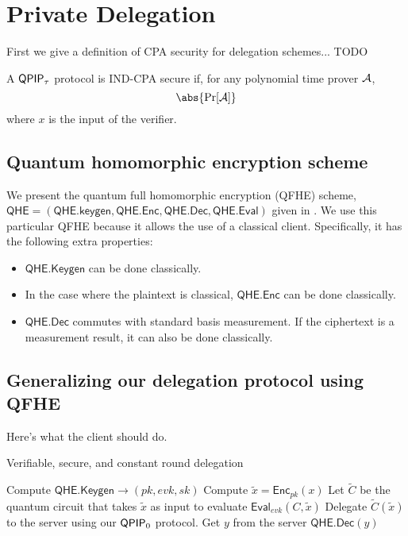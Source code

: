 \section{Private Delegation}


First we give a definition of CPA security for delegation schemes... TODO

\begin{dfn}
	A $\operatorname{\mathsf{QPIP}}_\tau$ protocol is IND-CPA secure if, for any polynomial time prover $\mathcal{A}$,
	$$\abs{\Pr[\cA]}$$
	where $x$ is the input of the verifier.
\end{dfn}

\subsection{Quantum homomorphic encryption scheme}


We present the quantum full homomorphic encryption (QFHE) scheme, $\mathsf{QHE}=(\mathsf{QHE.keygen}, \mathsf{QHE.Enc}, \mathsf{QHE.Dec}, \mathsf{QHE.Eval})$ given in \cite{mahadev_qfhe}. We use this particular QFHE because it allows the use of a classical client. Specifically, it has the following extra properties:
\begin{itemize}
	\item $\mathsf{QHE.Keygen}$ can be done classically.
	\item In the case where the plaintext is classical, $\mathsf{QHE.Enc}$ can be done classically.
	\item $\mathsf{QHE.Dec}$ commutes with standard basis measurement. If the ciphertext is a measurement result, it can also be done classically.
\end{itemize}

\subsection{Generalizing our delegation protocol using QFHE}


Here's what the client should do.

\begin{algorithm}
	\caption{Verifiable, secure, and constant round delegation}
	\label{ProtoPrivateDelegation}
	\begin{algorithmic}[1]
			\State Compute $\mathsf{QHE.Keygen}\rightarrow(pk, evk, sk)$
			\State Compute $\tilde{x}=\mathsf{Enc}_{pk}(x)$
			\State Let $\tilde{C}$ be the quantum circuit that takes $\tilde{x}$ as input to evaluate $\mathsf{Eval}_{evk}(C, \tilde{x})$
			\State Delegate $\tilde{C}(\tilde{x})$ to the server using our $\operatorname{\mathsf{QPIP}}_0$ protocol.
			\State Get $y$ from the server
			\State \Return $\mathsf{QHE.Dec}(y)$
		\EndProcedure
	\end{algorithmic}
\end{algorithm}

